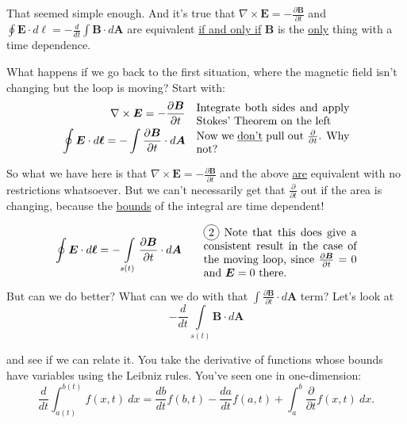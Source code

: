 \documentclass{article}
\newcommand*\circled[1]{\tikz[baseline=(char.base)]{
            \node[shape=circle,draw,inner sep=2pt] (char) {#1};}}
\numberwithin{equation}{section}
\begin{document}
That seemed simple enough. And it's true that $\displaystyle \nabla \times \bm{E} = -\frac{\partial \bm{B}}{\partial t}$ and $\displaystyle \oint \bm{E} \cdot d\bm{\ell} = -\frac{d}{dt} \int \bm{B} \cdot d\bm{A}$ are equivalent \underline{if and only if} $\bm{B}$ is the \underline{only} thing with a time dependence.

What happens if we go back to the first situation, where the magnetic field isn't changing but the loop is moving? Start with:
\begin{align*}
    \nabla \times \bm{E} = -\frac{\partial \bm{B}}{\partial t} && \parbox[c]{0.4\textwidth}{Integrate both sides and apply Stokes' Theorem on the left} \\
    \oint \bm{E} \cdot d\bm{\ell} = -\int \frac{\partial \bm{B}}{\partial t} \cdot d\bm{A} && \parbox[c]{0.4\textwidth}{Now we \underline{don't} pull out $\frac{\partial}{\partial t}$. Why not?}
\end{align*}

So what we have here is that $\displaystyle \nabla \times \bm{E} = -\frac{\partial \bm{B}}{\partial t}$ and the above \underline{are} equivalent with no restrictions whatsoever. But we can't necessarily get that $\displaystyle \frac{\partial}{\partial t}$ out if the area is changing, because the \underline{bounds} of the integral are time dependent!

\begin{equation*}
    \oint \bm{E} \cdot d\bm{\ell} = -\int\limits_{s(t)} \frac{\partial \bm{B}}{\partial t} \cdot d\bm{A} \qquad \parbox[c]{0.4\textwidth}{\circled{2} Note that this does give a consistent result in the case of the moving loop, since $\frac{\partial \bm{B}}{\partial t} = 0$ and $\bm{E} = 0$ there.}
\end{equation*}

But can we do better? What can we do with that $\displaystyle \int \frac{\partial \bm{B}}{\partial t} \cdot d\bm{A}$ term? Let's look at
\begin{equation*}
    -\frac{d}{dt} \int\limits_{s(t)} \bm{B} \cdot d\bm{A}
\end{equation*}

and see if we can relate it. You take the derivative of functions whose bounds have variables using the Leibniz rules. You've seen one in one-dimension:
\begin{equation*}
    \frac{d}{dt} \int_{a(t)}^{b(t)} f(x, t)\ dx = \frac{d b}{dt} f(b, t) - \frac{d a}{dt} f(a, t) + \int_a^b \frac{\partial}{\partial t} f(x, t)\ dx.
\end{equation*}
\end{document}
